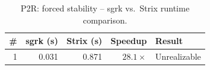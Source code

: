 \begin{table}[htbp]
\centering
\caption{P2R: forced stability -- sgrk vs.\ Strix runtime comparison.}
\label{tab:P2R_forced_stability}
\begin{tabular}{r r r r l}
\toprule
\# & sgrk (s) & Strix (s) & Speedup & Result \\
\midrule
1 & 0.031 & 0.871 & $28.1\times$ & Unrealizable \\
\bottomrule
\end{tabular}
\end{table}
